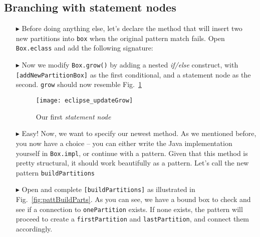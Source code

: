 \newpage
\hypertarget{conBran tex}{}
\subsection{Branching with statement nodes}
\texHeader

\begin{itemize}

\item[$\blacktriangleright$] Before doing anything else, let's declare the method that will insert two new partitions into \texttt{box} when the original
pattern match fails. Open \texttt{Box.eclass} and add the following signature: 

\vspace{0.5cm}

\item[$\blacktriangleright$] Now we modify \texttt{Box.grow()} by adding a nested \emph{if/else} construct, with \texttt{[addNewPartitionBox]} as the
first conditional, and a statement node as the second. \texttt{grow} should now resemble Fig.~\ref{fig:updateGrow}

\vspace{0.5cm}

\begin{figure}[htp]
\begin{center}
  \texttt{[image: eclipse\_updateGrow]}
  \caption{Our first \emph{statement node}}
  \label{fig:updateGrow}
\end{center}
\end{figure}

\vspace{0.5cm}

\item[$\blacktriangleright$] Easy! Now, we want to specify our newest method. As we mentioned before, you now have a choice -- you can either write the Java
implementation yourself in \texttt{Box.impl}, or continue with a pattern. Given that this method is pretty structural, it should work beautifully as a pattern.
Let's call the new pattern \texttt{buildPartitions}

\vspace{0.5cm}

\item[$\blacktriangleright$] Open and complete \texttt{[buildPartitions]} as illustrated in Fig.~\ref{fig:pattBuildParts}. As you can see, we have a bound
box to check and see if a connection to \texttt{onePartition} exists. If none exists, the pattern will proceed to create a \texttt{firstPartition} and
\texttt{lastPartition}, and connect them accordingly.


\end{itemize}
